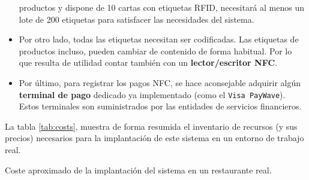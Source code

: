\begin{itemize}
productos y dispone de 10 cartas con etiquetas \acs{RFID}, necesitará al menos 
un lote de 200 etiquetas para satisfacer las necesidades del sistema.
\item Por otro lado, todas las etiquetas necesitan ser codificadas. Las
etiquetas de productos incluso, pueden cambiar de contenido de forma habitual.
Por lo que resulta de utilidad contar también con un \textbf{lector/escritor 
\acs{NFC}}.
\item Por último, para registrar los pagos \acs{NFC}, se hace aconsejable
adquirir algún \textbf{terminal de pago} dedicado ya implementado (como el
\texttt{Visa PayWave}). Estos terminales son suministrados por las entidades
de servicios financieros.
\end{itemize}

La tabla \ref{tab:costs}, muestra de forma resumida el inventario de 
recursos (y sus precios) necesarios para la implantación de este sistema en un 
entorno de trabajo real.

\begin{sidewaystable}[hp]
  \centering
  \label{tab:costs}
  {\normalsize
  
  }  
  \caption[Coste aproximado de la implantación del sistema en un 
  restaurante real.]{Coste aproximado de la implantación del sistema en un 
  restaurante real.}
\end{sidewaystable}


